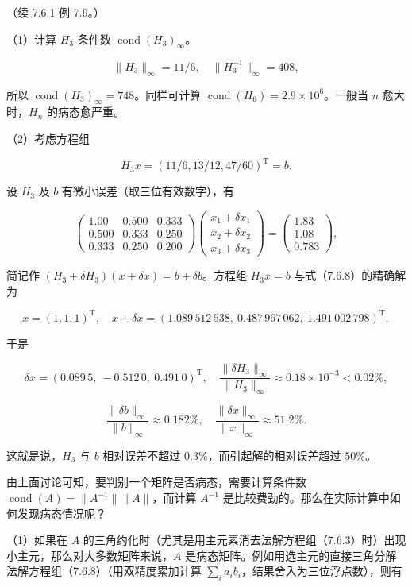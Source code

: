 \documentclass[
  10pt,
  fontset=fandol]{ctexart}
\begin{document}
（续 7.6.1 例 7.9。）

（1）计算 \(H_3\) 条件数 \(\operatorname{cond}(H_3)_\infty\)。

\[
\|H_3\|_\infty=11/6,\quad\|H_3^{-1}\|_\infty=408,
\]

所以 \(\operatorname{cond}(H_3)_\infty=748\)。同样可计算 \(\operatorname{cond}(H_6)=2.9\times10^6\)。一般当 \(n\) 愈大时，\(H_n\) 的病态愈严重。

（2）考虑方程组

\[
H_3x=(11/6,13/12,47/60)^{\mathrm T}=b.
\]

设 \(H_3\) 及 \(b\) 有微小误差（取三位有效数字），有

\[
\begin{pmatrix}
1.00&0.500&0.333\\
0.500&0.333&0.250\\
0.333&0.250&0.200
\end{pmatrix}
\begin{pmatrix}x_1+\delta x_1\\x_2+\delta x_2\\x_3+\delta x_3\end{pmatrix}
=\begin{pmatrix}1.83\\1.08\\0.783\end{pmatrix},
\tag{7.6.8}
\]

简记作 \((H_3+\delta H_3)(x+\delta x)=b+\delta b\)。方程组 \(H_3x=b\) 与式（7.6.8）的精确解为

\[
x=(1,1,1)^{\mathrm T},\quad
x+\delta x=(1.089\,512\,538,\ 0.487\,967\,062,\ 1.491\,002\,798)^{\mathrm T},
\]

于是

\[
\delta x=(0.089\,5,\ -0.512\,0,\ 0.491\,0)^{\mathrm T},\quad
\frac{\|\delta H_3\|_\infty}{\|H_3\|_\infty}\approx0.18\times10^{-3}<0.02\%,
\]

\[
\frac{\|\delta b\|_\infty}{\|b\|_\infty}\approx0.182\%,\quad
\frac{\|\delta x\|_\infty}{\|x\|_\infty}\approx51.2\%.
\]

这就是说，\(H_3\) 与 \(b\) 相对误差不超过 \(0.3\%\)，而引起解的相对误差超过 \(50\%\)。

由上面讨论可知，要判别一个矩阵是否病态，需要计算条件数 \(\operatorname{cond}(A)=\|A^{-1}\|\|A\|\)，而计算 \(A^{-1}\) 是比较费劲的。那么在实际计算中如何发现病态情况呢？

（1）如果在 \(A\) 的三角约化时（尤其是用主元素消去法解方程组（7.6.3）时）出现小主元，那么对大多数矩阵来说，\(A\) 是病态矩阵。例如用选主元的直接三角分解法解方程组（7.6.8）（用双精度累加计算 \(\sum_i a_ib_i\)，结果舍入为三位浮点数），则有
\end{document}
